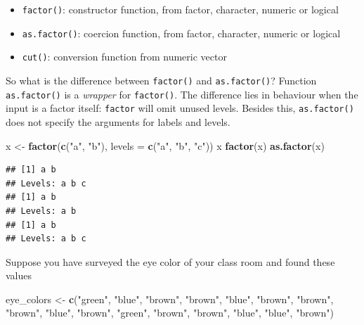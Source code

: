 \documentclass[]{book}
\newenvironment{Shaded}{\begin{snugshade}}{\end{snugshade}}
\newcommand{\DataTypeTok}[1]{\textcolor[rgb]{0.13,0.29,0.53}{#1}}
\newcommand{\KeywordTok}[1]{\textcolor[rgb]{0.13,0.29,0.53}{\textbf{#1}}}
\newcommand{\NormalTok}[1]{#1}
\newcommand{\StringTok}[1]{\textcolor[rgb]{0.31,0.60,0.02}{#1}}
\providecommand{\tightlist}{%
  \setlength{\itemsep}{0pt}\setlength{\parskip}{0pt}}
\begin{document}
\begin{itemize}
\tightlist
\item
  \texttt{factor()}: constructor function, from factor, character, numeric or logical
\item
  \texttt{as.factor()}: coercion function, from factor, character, numeric or logical
\item
  \texttt{cut()}: conversion function from numeric vector
\end{itemize}

So what is the difference between \texttt{factor()} and \texttt{as.factor()}? Function \texttt{as.factor()} is a \emph{wrapper} for \texttt{factor()}. The difference lies in behaviour when the input is a factor itself: \texttt{factor} will omit unused levels. Besides this, \texttt{as.factor()} does not specify the arguments for labels and levels.

\begin{Shaded}
\begin{Highlighting}[]
\NormalTok{x <-}\StringTok{ }\KeywordTok{factor}\NormalTok{(}\KeywordTok{c}\NormalTok{(}\StringTok{"a"}\NormalTok{, }\StringTok{"b"}\NormalTok{), }\DataTypeTok{levels =} \KeywordTok{c}\NormalTok{(}\StringTok{"a"}\NormalTok{, }\StringTok{"b"}\NormalTok{, }\StringTok{"c"}\NormalTok{))}
\NormalTok{x}
\KeywordTok{factor}\NormalTok{(x)}
\KeywordTok{as.factor}\NormalTok{(x)}
\end{Highlighting}
\end{Shaded}

\begin{verbatim}
## [1] a b
## Levels: a b c
## [1] a b
## Levels: a b
## [1] a b
## Levels: a b c
\end{verbatim}

Suppose you have surveyed the eye color of your class room and found these values

\begin{Shaded}
\begin{Highlighting}[]
\NormalTok{eye_colors <-}\StringTok{ }\KeywordTok{c}\NormalTok{(}\StringTok{"green"}\NormalTok{, }\StringTok{"blue"}\NormalTok{, }\StringTok{"brown"}\NormalTok{, }\StringTok{"brown"}\NormalTok{, }\StringTok{"blue"}\NormalTok{,}
    \StringTok{"brown"}\NormalTok{, }\StringTok{"brown"}\NormalTok{, }\StringTok{"brown"}\NormalTok{, }\StringTok{"blue"}\NormalTok{, }\StringTok{"brown"}\NormalTok{, }\StringTok{"green"}\NormalTok{,}
    \StringTok{"brown"}\NormalTok{, }\StringTok{"brown"}\NormalTok{, }\StringTok{"blue"}\NormalTok{, }\StringTok{"blue"}\NormalTok{, }\StringTok{"brown"}\NormalTok{)}
\end{Highlighting}
\end{Shaded}
\end{document}
